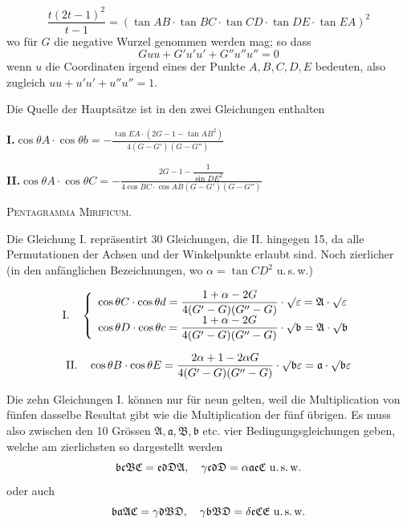 \documentclass[12pt,a4paper]{article}
\newcommand{\tang}{\tan} %
\begin{document}
\[
\frac{t(2t-1)^2}{t-1} = (\tang AB \cdot \tang BC \cdot \tang CD \cdot \tang DE \cdot \tang EA)^2
\]
wo f\"ur $G$ die negative Wurzel genommen werden mag; so dass
\[
Guu + G'u'u' + G''u''u'' = 0
\]
wenn $u$ die Coordinaten irgend eines der Punkte $A, B, C, D, E$ bedeuten,
also zugleich $uu + u'u' + u''u'' = 1$.

Die Quelle der Haupts\"atze ist in den zwei Gleichungen enthalten

\vspace{0.5em}
\noindent
\textbf{I.}\quad$\displaystyle\cos\theta A \cdot \cos\theta b = -\frac{\tang EA \cdot (2G-1-\tang AB^2)}{4(G-G')(G-G'')}$

\vspace{0.3em}
\noindent
\textbf{II.}\quad$\displaystyle\cos\theta A \cdot \cos\theta C = -\frac{2G-1-\dfrac{1}{\sin DE^2}}{4\cos BC \cdot \cos AB (G-G')(G-G'')}$

\vspace{1em}

\begin{center}
\textsc{Pentagramma Mirificum.}
\end{center}

Die Gleichung I. repr\"asentirt 30 Gleichungen, die II. hingegen 15, da alle
Permutationen der Achsen und der Winkelpunkte erlaubt sind. Noch zierlicher
(in den anf\"anglichen Bezeichnungen, wo $\alpha = \tang CD^2$ u.\,s.\,w.)

\[
\begin{array}{ll}
\text{I.} \quad
\left\{\begin{array}{l}
\cos\theta C \cdot \cos\theta d = \dfrac{1+\alpha-2G}{4(G'-G)(G''-G)} \cdot \surd\varepsilon = \mathfrak{A} \cdot \surd\varepsilon \\[1.2ex]
\cos\theta D \cdot \cos\theta c = \dfrac{1+\alpha-2G}{4(G'-G)(G''-G)} \cdot \surd\mathfrak{b} = \mathfrak{A} \cdot \surd\mathfrak{b}
\end{array}\right.
\end{array}
\]

\[
\text{II.} \quad
\cos\theta B \cdot \cos\theta E = \frac{2\alpha+1-2\alpha G}{4(G'-G)(G''-G)} \cdot \surd\mathfrak{b}\varepsilon
= \mathfrak{a} \cdot \surd\mathfrak{b}\varepsilon
\]

Die zehn Gleichungen I. k\"onnen nur f\"ur neun gelten, weil die Multipli\-cation
von f\"unfen dasselbe Resultat gibt wie die Multiplication der f\"unf \"ubrigen.
Es muss also zwischen den 10 Gr\"ossen $\mathfrak{A}, \mathfrak{a}, \mathfrak{B}, \mathfrak{b}$ etc. vier Bedingungsgleichungen
geben, welche am zierlichsten so dargestellt werden
\[
\mathfrak{b}\mathfrak{c}\mathfrak{BC} = \mathfrak{e}\mathfrak{d}\mathfrak{DA}, \quad
\gamma\mathfrak{cd}\mathfrak{D} = \alpha\mathfrak{a}\mathfrak{e}\mathfrak{C} \text{ u.\,s.\,w.}
\]
oder auch
\[
\mathfrak{b}\mathfrak{a}\mathfrak{AC} = \gamma\mathfrak{d}\mathfrak{BD}, \quad
\gamma\mathfrak{b}\mathfrak{BD} = \delta\mathfrak{e}\mathfrak{CE} \text{ u.\,s.\,w.}
\]
\end{document}
